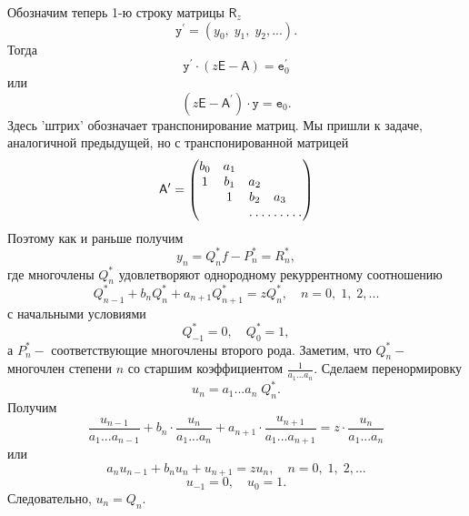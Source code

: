 \documentclass[12 pt, a4 paper]{article}
\theoremstyle{plain}   \newtheorem{Pro}{Задача}
\begin{document}
Обозначим теперь 1-ю строку матрицы
$ \mathsf{R}_z $
$$
  \mathtt{y}^{\prime}=(y_0 , \; y_1 , \; y_2 ,...).
$$
Тогда
$$
  \mathtt{y}^{\prime} \cdot
  (z \mathsf{E}-\mathsf{A})= \mathtt{e}_0 ^{\prime}
$$
или
$$
  (z\mathsf{E}-\mathsf{A}^{\prime})\cdot \mathtt{y} =\mathtt{e}_0 .
$$
Здесь 'штрих' обозначает транспонирование матриц.
Мы пришли к задаче, аналогичной предыдущей, но с транспонированной
матрицей
\begin{equation*}
  \mathsf{A}^{\prime}=
    \begin{pmatrix}
	  b_0 & a_1 & \; & \; & \; \\
	  1 & b_1 & a_2 & \; & \; \\
	  \; & 1 & b_2 & a_3 & \; \\
	  \; & \; & \hdotsfor{3}
	\end{pmatrix}
\end{equation*}
Поэтому как и раньше получим
$$
  y_n = Q_n ^{\ast} f -P_n ^{\ast} =R_n ^{\ast},
$$
где многочлены
$ Q_n ^{\ast} $
удовлетворяют однородному рекуррентному соотношению
$$
  Q_{n-1}^{\ast} +b_n Q_n ^{\ast} + a_{n+1} Q_{n+1}^{\ast}=
  zQ_n ^{\ast} , \quad n=0, \; 1, \; 2,...
$$
с начальными условиями
$$
  Q_{-1}^{\ast}=0, \quad
  Q_0 ^{\ast}=1,
$$
а
$ P_n ^{\ast} - $
соответствующие многочлены второго рода. Заметим, что
$ Q_n ^{\ast} - $
многочлен степени
$ n $
со старшим коэффициентом
$ \frac{1}{a_1 ...a_n } . $
Сделаем перенормировку
$$
  u_n =a_1 ... a_n \; Q_n ^{\ast} .
$$
Получим
$$
  \frac{u_{n-1}}{a_1 ...a_{n-1}}+
  b_n \cdot \frac{u_n}{a_1 ...a_n }+
  a_{n+1} \cdot \frac{u_{n+1}}{a_1 ...a_{n+1}}=
  z \cdot \frac{u_n}{a_1 ...a_n }
$$
или
$$
  a_n u_{n-1}+b_n u_n + u_{n+1} =z u_n ,
  \quad n=0, \; 1, \; 2,...
$$
$$
  u_{-1}=0, \quad u_0 =1.
$$
Следовательно,
$ u_n =Q_n . $
\\
\end{document}
